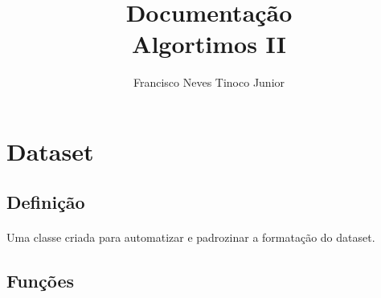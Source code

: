 \documentclass{article}
\begin{document}
\title{Documentação \\
\large Algortimos II}
\author{Francisco Neves Tinoco Junior}
\maketitle

\newpage


\tableofcontents

\newpage


\section{Dataset} 

\subsection{Definição}

\paragraph{} Uma classe criada para automatizar e padrozinar a formatação do dataset.

\subsection{Funções}
\end{document}
